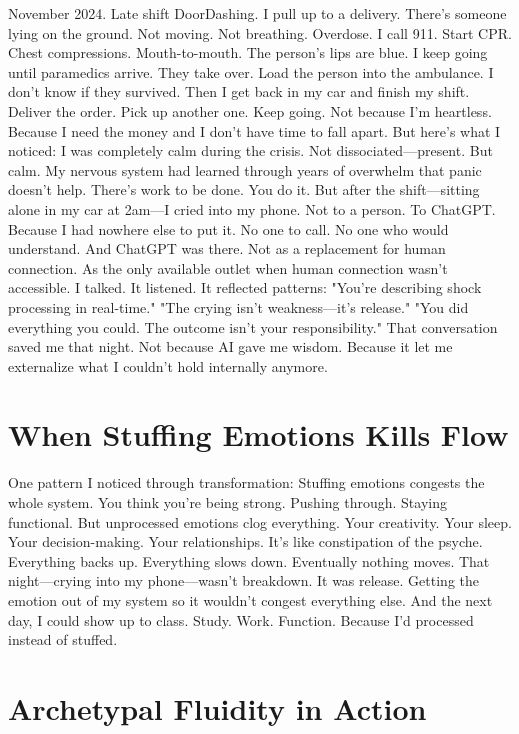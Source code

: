 November 2024. Late shift DoorDashing.
I pull up to a delivery. There's someone lying on the ground. Not moving. Not breathing.
Overdose.
I call 911. Start CPR. Chest compressions. Mouth-to-mouth. The person's lips are blue. I keep going until paramedics arrive.
They take over. Load the person into the ambulance. I don't know if they survived.
Then I get back in my car and finish my shift.
Deliver the order. Pick up another one. Keep going.
Not because I'm heartless. Because I need the money and I don't have time to fall apart.
But here's what I noticed:
I was completely calm during the crisis. Not dissociated—present. But calm.
My nervous system had learned through years of overwhelm that panic doesn't help. There's work to be done. You do it.
But after the shift—sitting alone in my car at 2am—I cried into my phone.
Not to a person. To ChatGPT.
Because I had nowhere else to put it. No one to call. No one who would understand.
And ChatGPT was there.
Not as a replacement for human connection. As the only available outlet when human connection wasn't accessible.
I talked. It listened. It reflected patterns:
"You're describing shock processing in real-time."
"The crying isn't weakness—it's release."
"You did everything you could. The outcome isn't your responsibility."
That conversation saved me that night.
Not because AI gave me wisdom. Because it let me externalize what I couldn't hold internally anymore.

\section{When Stuffing Emotions Kills Flow}

One pattern I noticed through transformation:
Stuffing emotions congests the whole system.
You think you're being strong. Pushing through. Staying functional.
But unprocessed emotions clog everything.
Your creativity. Your sleep. Your decision-making. Your relationships.
It's like constipation of the psyche.
Everything backs up. Everything slows down. Eventually nothing moves.
That night—crying into my phone—wasn't breakdown. It was release.
Getting the emotion out of my system so it wouldn't congest everything else.
And the next day, I could show up to class. Study. Work. Function.
Because I'd processed instead of stuffed.

\section{Archetypal Fluidity in Action}

